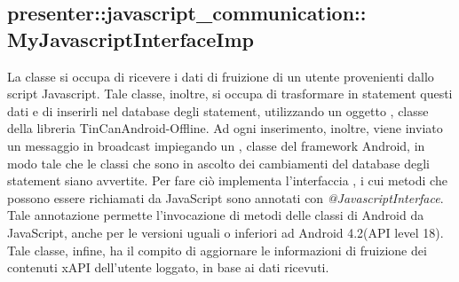 \documentclass[../Tesi.tex]{subfiles}
\begin{document}
		\subsection{presenter::javascript\_communication::\\MyJavascriptInterfaceImp}
		La classe  si occupa di ricevere i dati di fruizione di un utente provenienti dallo script Javascript. Tale classe, inoltre, si occupa di trasformare in statement questi dati e di inserirli nel database degli statement, utilizzando un oggetto , classe della libreria TinCanAndroid-Offline. Ad ogni inserimento, inoltre, viene inviato un messaggio in broadcast impiegando un , classe del framework Android, in modo tale che le classi che sono in ascolto dei cambiamenti del database degli statement siano avvertite. Per fare ciò implementa l'interfaccia , i cui metodi che possono essere richiamati da JavaScript sono annotati con \textit{@JavascriptInterface}. Tale annotazione permette l'invocazione di metodi delle classi di Android da JavaScript, anche per le versioni uguali o inferiori ad Android 4.2(API level 18). Tale classe, infine, ha il compito di aggiornare le informazioni di fruizione dei contenuti xAPI dell'utente loggato, in base ai dati ricevuti. 
\end{document}
